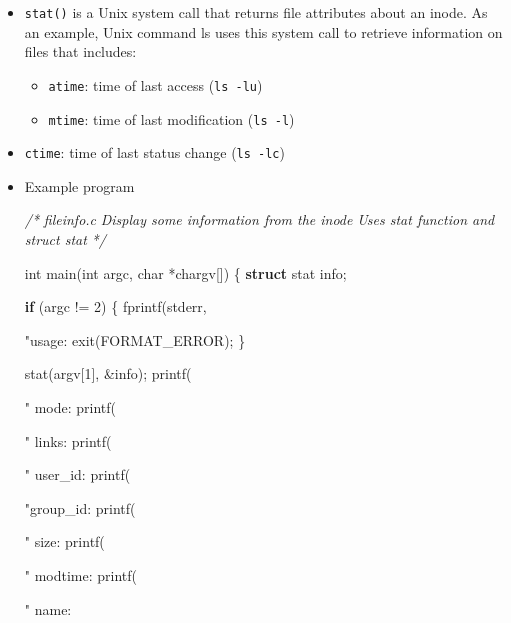 \documentclass[]{article}
\newenvironment{Shaded}{}{}
\newcommand{\KeywordTok}[1]{\textcolor[rgb]{0.00,0.44,0.13}{\textbf{#1}}}
\newcommand{\DataTypeTok}[1]{\textcolor[rgb]{0.56,0.13,0.00}{#1}}
\newcommand{\DecValTok}[1]{\textcolor[rgb]{0.25,0.63,0.44}{#1}}
\newcommand{\SpecialCharTok}[1]{\textcolor[rgb]{0.25,0.44,0.63}{#1}}
\newcommand{\StringTok}[1]{\textcolor[rgb]{0.25,0.44,0.63}{#1}}
\newcommand{\CommentTok}[1]{\textcolor[rgb]{0.38,0.63,0.69}{\textit{#1}}}
\newcommand{\ControlFlowTok}[1]{\textcolor[rgb]{0.00,0.44,0.13}{\textbf{#1}}}
\newcommand{\NormalTok}[1]{#1}
\begin{document}
\begin{itemize}
\item
  \texttt{stat()} is a Unix system call that returns file attributes
  about an inode. As an example, Unix command ls uses this system call
  to retrieve information on files that includes:

  \begin{itemize}
  \item
    \texttt{atime}: time of last access (\texttt{ls\ -lu})
  \item
    \texttt{mtime}: time of last modification (\texttt{ls\ -l})
  \end{itemize}
\item
  \texttt{ctime}: time of last status change (\texttt{ls\ -lc})
\item
  Example program

\begin{Shaded}
\begin{Highlighting}[]
\CommentTok{/*}
\CommentTok{ fileinfo.c}
\CommentTok{ Display some information from the inode}
\CommentTok{ Uses stat function and struct stat}
\CommentTok{ */}

\DataTypeTok{int}\NormalTok{ main(}\DataTypeTok{int}\NormalTok{ argc, }\DataTypeTok{char}\NormalTok{ *chargv[]) \{}
    \KeywordTok{struct}\NormalTok{ stat info;}

    \ControlFlowTok{if}\NormalTok{ (argc != }\DecValTok{2}\NormalTok{) \{}
\NormalTok{        fprintf(stderr, }\StringTok{"usage: %s filename}\SpecialCharTok{\textbackslash{}n}\StringTok{"}\NormalTok{, argv[}\DecValTok{0}\NormalTok{]);}
\NormalTok{        exit(FORMAT_ERROR);}
\NormalTok{    \}}

\NormalTok{    stat(argv[}\DecValTok{1}\NormalTok{], &info);}
\NormalTok{    printf(}\StringTok{"    mode: %o}\SpecialCharTok{\textbackslash{}n}\StringTok{"}\NormalTok{, info.st_mode);			}\CommentTok{// type + mode}
\NormalTok{    printf(}\StringTok{"   links: %u}\SpecialCharTok{\textbackslash{}n}\StringTok{"}\NormalTok{, info.st_nlink);		}\CommentTok{// no of links}
\NormalTok{    printf(}\StringTok{" user_id: %d}\SpecialCharTok{\textbackslash{}n}\StringTok{"}\NormalTok{, info.st_uid);			}\CommentTok{// user id}
\NormalTok{    printf(}\StringTok{"group_id: %d}\SpecialCharTok{\textbackslash{}n}\StringTok{"}\NormalTok{, info.st_gid);			}\CommentTok{// group id}
\NormalTok{    printf(}\StringTok{"    size: %d}\SpecialCharTok{\textbackslash{}n}\StringTok{"}\NormalTok{, (}\DataTypeTok{int}\NormalTok{)info.st_size);	}\CommentTok{// file size}
\NormalTok{    printf(}\StringTok{" modtime: %d}\SpecialCharTok{\textbackslash{}n}\StringTok{"}\NormalTok{, (}\DataTypeTok{int}\NormalTok{)info.st_mtime);	}\CommentTok{// modified}
\NormalTok{    printf(}\StringTok{"    name: %s}\SpecialCharTok{\textbackslash{}n}\StringTok{"}\NormalTok{, argv[}\DecValTok{1}\NormalTok{]);				}\CommentTok{// filename}

}}}}}}}}
\end{Highlighting}
\end{Shaded}
\end{itemize}
\end{document}
